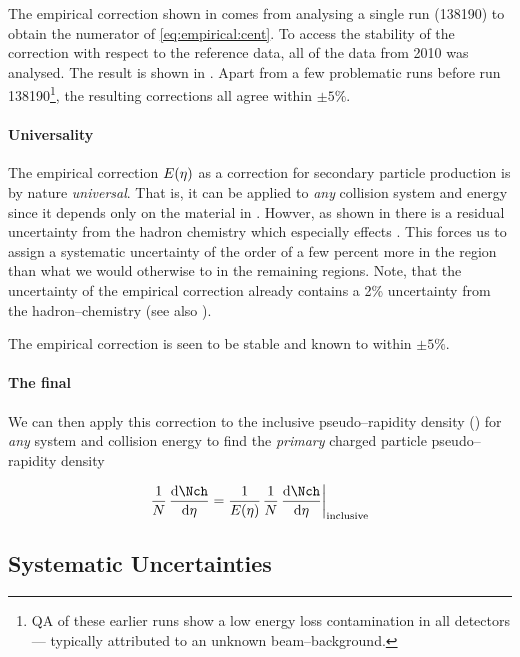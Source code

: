 The empirical correction shown in  comes
from analysing a single run (138190) to obtain the numerator of
\eqref{eq:empirical:cent}.  To access the stability of the correction
with respect to the reference data, all of the \PbPbCol{} data from
2010 was analysed.  The result is shown in
.  Apart from a few problematic
runs before run 138190\footnote{QA of these earlier runs show a low
  energy loss contamination in all detectors --- typically attributed
  to an unknown beam--background.}, the resulting corrections all
agree within $\pm5\%$.


\paragraph{Universality} The empirical correction $\EmpCor$ as a
correction for secondary particle production is by nature
\emph{universal}.  That is, it can be applied to \emph{any} collision
system and energy since it depends only on the material in \ALICE{}.
Howver, as shown in  there is a residual
uncertainty from the hadron chemistry which especially effects
.  This forces us to assign a systematic uncertainty of the
order of a few percent more in the  region than what we would
otherwise to in the remaining regions.  Note, that the uncertainty of
the empirical correction already contains a 2\% uncertainty from the
hadron--chemistry (see also ).

The empirical correction is seen to be stable and known to within
$\pm5\%$.  


\paragraph{The final \ndndeta{}}
We can then apply this correction to the inclusive pseudo--rapidity
density (\indndeta{}) for \emph{any} system and collision energy to
find the \emph{primary} charged particle pseudo--rapidity density

\begin{equation}
  \label{eq:empirical:applied}
  \ndndeta = \frac{1}{\EmpCor{}} \indndeta{}
\end{equation}

\subsection{Systematic Uncertainties}
\label{sec:sub:dndeta:syserr}

